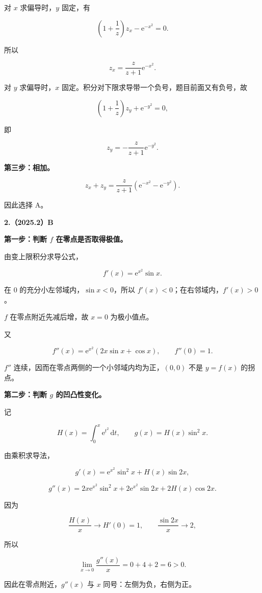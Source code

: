 \documentclass[UTF8,11pt,fontset=windows]{ctexart}
\begin{document}
对 $x$ 求偏导时，$y$ 固定，有

$$
\left(1+\frac1z\right)z_x-\mathrm e^{-x^2}=0.
$$

所以

$$
z_x=\frac{z}{z+1}\mathrm e^{-x^2}.
$$

对 $y$ 求偏导时，$x$ 固定。积分对下限求导带一个负号，题目前面又有负号，故

$$
\left(1+\frac1z\right)z_y+\mathrm e^{-y^2}=0,
$$

即

$$
z_y=-\frac{z}{z+1}\mathrm e^{-y^2}.
$$

\textbf{第三步：相加。}

$$
\boxed{z_x+z_y=\frac{z}{z+1}\left(\mathrm e^{-x^2}-\mathrm e^{-y^2}\right)}.
$$

因此选择 A。

\clearpage

\textbf{2.（2025.2）B}

\textbf{第一步：判断 $f$ 在零点是否取得极值。}

由变上限积分求导公式，

$$
f'(x)=\mathrm e^{x^2}\sin x.
$$

在 $0$ 的充分小左邻域内，$\sin x<0$，所以 $f'(x)<0$；在右邻域内，$f'(x)>0$。

$f$ 在零点附近先减后增，故 $x=0$ 为极小值点。

又

$$
f''(x)=\mathrm e^{x^2}(2x\sin x+\cos x),\qquad f''(0)=1.
$$

$f''$ 连续，因而在零点两侧的一个小邻域内均为正，$(0,0)$ 不是 $y=f(x)$ 的拐点。

\textbf{第二步：判断 $g$ 的凹凸性变化。}

记

$$
H(x)=\int_0^x\mathrm e^{t^2}\,\mathrm dt,\qquad g(x)=H(x)\sin^2x.
$$

由乘积求导法，

$$
g'(x)=\mathrm e^{x^2}\sin^2x+H(x)\sin2x,
$$

$$
g''(x)=2x\mathrm e^{x^2}\sin^2x
+2\mathrm e^{x^2}\sin2x+2H(x)\cos2x.
$$

因为

$$
\frac{H(x)}x\longrightarrow H'(0)=1,
\qquad \frac{\sin2x}x\longrightarrow2,
$$

所以

$$
\lim_{x\to0}\frac{g''(x)}x=0+4+2=6>0.
$$

因此在零点附近，$g''(x)$ 与 $x$ 同号：左侧为负，右侧为正。
\end{document}
